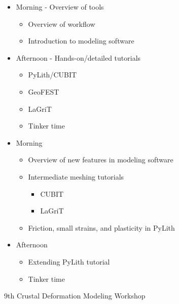 \documentclass[pdftex,cig,slideColor]{pp4slides}
\begin{document}
  \begin{itemize}
  \item Morning - Overview of tools
    \begin{itemize}
    \item Overview of workflow
    \item Introduction to modeling software
    \end{itemize}
  \item Afternoon - Hands-on/detailed tutorials
    \begin{itemize}
    \item PyLith/CUBIT
    \item GeoFEST
    \item LaGriT
    \item Tinker time
    \end{itemize}
 \end{itemize}

  \summary{}
 
  \begin{itemize}
  \item Morning
    \begin{itemize}
    \item Overview of new features in modeling software
    \item Intermediate meshing tutorials
      \begin{itemize}
      \item CUBIT
      \item LaGriT
      \end{itemize}
    \item Friction, small strains, and plasticity in PyLith
    \end{itemize}
  \item Afternoon
    \begin{itemize}
    \item Extending PyLith tutorial
    \item Tinker time
   \end{itemize}
  \end{itemize}

\foilhead{\ }
  \summary{}

  \vfill
  \begin{center}
    {\LARGE 9th Crustal Deformation Modeling Workshop}
  \end{center}
  \vfill
 
\end{document}
